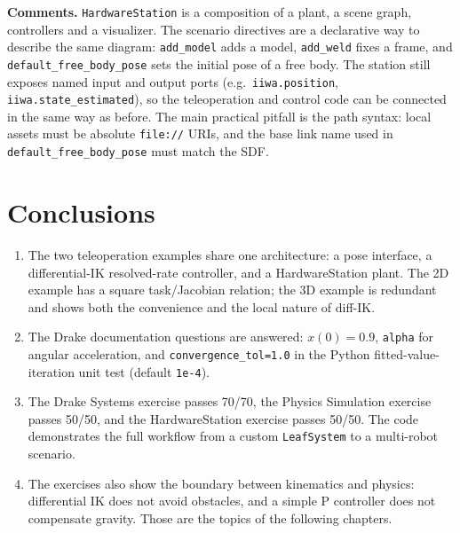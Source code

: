 \documentclass[11pt]{article}
\begin{document}
\textbf{Comments.}  \texttt{HardwareStation} is a composition of a plant, a
scene graph, controllers and a visualizer.  The scenario directives are a
declarative way to describe the same diagram: \texttt{add\_model} adds a
model, \texttt{add\_weld} fixes a frame, and \texttt{default\_free\_body\_pose}
sets the initial pose of a free body.  The station still exposes named input
and output ports (e.g.\ \texttt{iiwa.position},
\texttt{iiwa.state\_estimated}), so the teleoperation and control code can be
connected in the same way as before.  The main practical pitfall is the path
syntax: local assets must be absolute \texttt{file://} URIs, and the base link
name used in \texttt{default\_free\_body\_pose} must match the SDF.

\section{Conclusions}

\begin{enumerate}[leftmargin=1.4em]
  \item The two teleoperation examples share one architecture: a pose
        interface, a differential-IK resolved-rate controller, and a
        HardwareStation plant.  The 2D example has a square task/Jacobian
        relation; the 3D example is redundant and shows both the convenience
        and the local nature of diff-IK.
  \item The Drake documentation questions are answered: $x(0)=0.9$,
        \texttt{alpha} for angular acceleration, and
        \texttt{convergence\_tol=1.0} in the Python fitted-value-iteration
        unit test (default \texttt{1e-4}).
  \item The Drake Systems exercise passes 70/70, the Physics Simulation
        exercise passes 50/50, and the
        HardwareStation exercise passes 50/50.  The code demonstrates the
        full workflow from a custom \texttt{LeafSystem} to a multi-robot
        scenario.
  \item The exercises also show the boundary between kinematics and physics:
        differential IK does not avoid obstacles, and a simple P controller
        does not compensate gravity.  Those are the topics of the following
        chapters.
\end{enumerate}

\end{document}

